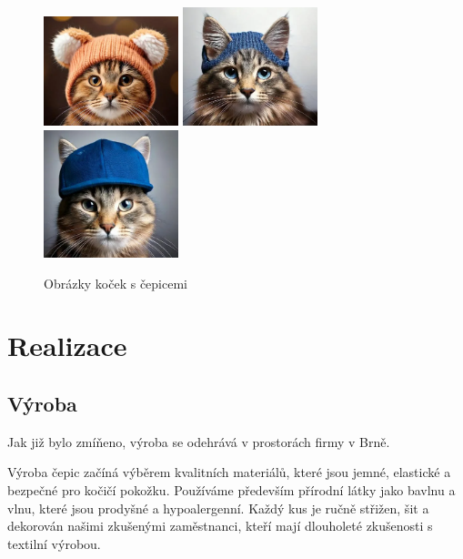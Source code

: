 \documentclass[12pt, a4paper]{article}
\begin{document}
\begin{figure}[h!]
  \centering
  \includegraphics[width=0.35\textwidth, height=0.3\textwidth]{files/kocka1.png}
  \hspace{0.5cm}
  \vspace{0.5cm}
  \includegraphics[width=0.35\textwidth, height=0.3\textwidth]{files/kocka2.png}
  \hspace{0.5cm}
  \includegraphics[width=0.35\textwidth, height=0.3\textwidth]{files/kocka3.png}
  \caption{Obrázky koček s čepicemi}
\end{figure}

\section{Realizace}
\subsection{Výroba}

Jak již bylo zmíňeno, výroba se odehrává v prostorách firmy v Brně. 
\vspace{10pt}

Výroba čepic začíná výběrem kvalitních materiálů, které jsou jemné, elastické a bezpečné pro kočičí pokožku.
Používáme především přírodní látky jako bavlnu a vlnu, které jsou prodyšné a hypoalergenní.
Každý kus je ručně střižen, šit a dekorován našimi zkušenými zaměstnanci, kteří mají dlouholeté zkušenosti s textilní výrobou.
\end{document}
